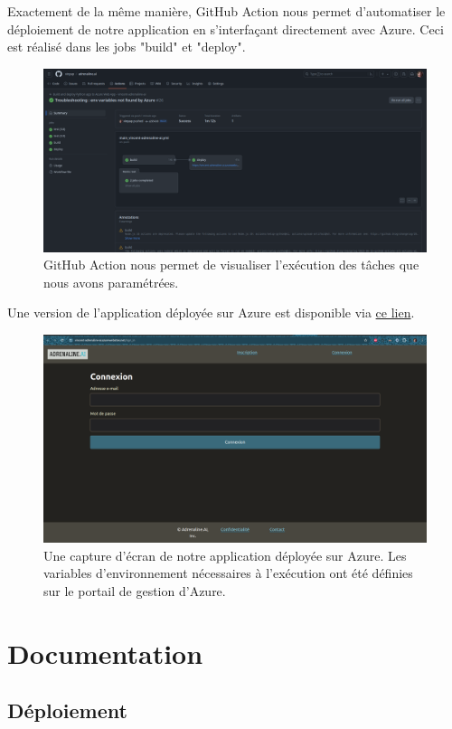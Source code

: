 \documentclass[french]{article}
\begin{document}
    Exactement de la même manière, GitHub Action nous permet d'automatiser le déploiement de notre application en s'interfaçant directement avec Azure. Ceci est réalisé dans les jobs "build" et "deploy".
    \begin{figure}[h!]
        \includegraphics[width=12cm]{gh_action_1}
        \centering
        \caption{GitHub Action nous permet de visualiser l'exécution des tâches que nous avons paramétrées.}
        \centering
    \end{figure}
    
    Une version de l'application déployée sur Azure est disponible via \href{https://vincent-adrenaline-ai.azurewebsites.net/}{ce lien}. 

    \begin{figure}[h!]
        \includegraphics[width=12cm]{azure}
        \centering
        \caption{Une capture d'écran de notre application déployée sur Azure. Les variables d'environnement nécessaires à l'exécution ont été définies sur le portail de gestion d'Azure.}
        \centering
    \end{figure}
    
    \section{Documentation}
    \subsection{Déploiement}
\end{document}
